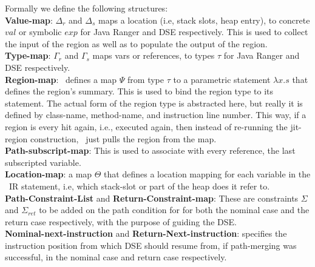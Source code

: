 Formally we define the following structures:\\
%
\textbf{Value-map}: $\Delta_r$ and $\Delta_s$ maps a location (i.e, stack slots, heap entry), to concrete $val$ or
symbolic $exp$ for Java Ranger and DSE respectively. This is used to collect the input of the region as well as to
populate the output of the region.\\
\textbf{Type-map}: $\Gamma_r$ and $\Gamma_s$ maps vars or references, to types $\tau$ for Java Ranger and DSE respectively.\\
\textbf{Region-map}: \tool\ defines a map $\Psi$ from type $\tau$  to a parametric statement $\lambda x.s$ that defines
the region\rq s summary. This is used to bind the region type to its statement. The actual form of the region type is
abstracted here, but really it is defined by class-name, method-name, and instruction line number. This way, if a region
is every hit again, i.e., executed again, then instead of re-running the jit-region construction, \toolshort\ just pulls
the region from the map.\\
\textbf{Path-subscript-map}: This is used to associate with every reference, the last subscripted variable.\\
\textbf{Location-map}: a map $\Theta$ that defines a location mapping for each variable in the \tool\ IR statement, i.e, which stack-slot or part of the heap does it refer to.\\
\textbf{Path-Constraint-List} and \textbf{Return-Constraint-map}: These are constraints $\Sigma$ and $\Sigma_{ret}$ to be added on the path condition for for both the nominal case and the return case respectively, with the purpose of guiding the DSE.\\
\textbf{Nominal-next-instruction} and \textbf{Return-Next-instruction}: specifies the instruction position from which DSE should resume from, if path-merging was successful, in the nominal case and return case respectively.\\



